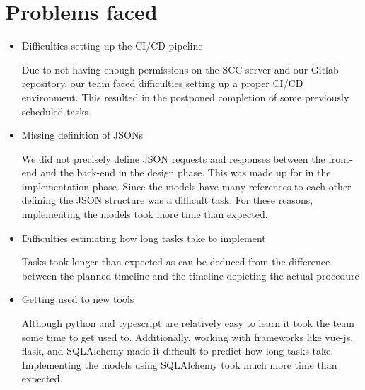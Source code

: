 \section{Problems faced}
\begin{itemize}
    \item Difficulties setting up the CI/CD pipeline 
    \par Due to not having enough permissions on the SCC server and our Gitlab repository, our team faced difficulties setting up a proper CI/CD environment. This resulted in the postponed completion of some previously scheduled tasks.
    
    \item 
    Missing definition of JSONs
    \par
    We did not precisely define JSON requests and responses between the front-end and the back-end in the design phase. This was made up for in the implementation phase. Since the models have many references to each other defining the JSON structure was a difficult task. For these reasons, implementing the models took more time than expected.
    
    \item 
    Difficulties estimating how long tasks take to implement
    \par Tasks took longer than expected as can be deduced from the difference between the planned timeline and the timeline depicting the actual procedure

    \item
    Getting used to new tools\par
    Although \gls{python} and \gls{typescript} are relatively easy to learn it took the team some time to get used to. Additionally, working with frameworks like \gls{vue-js}, \gls{flask}, and \gls{SQLAlchemy} made it difficult to predict how long tasks take. Implementing the models using \gls{SQLAlchemy} took much more time than expected.
    
\end{itemize}
\newpage
